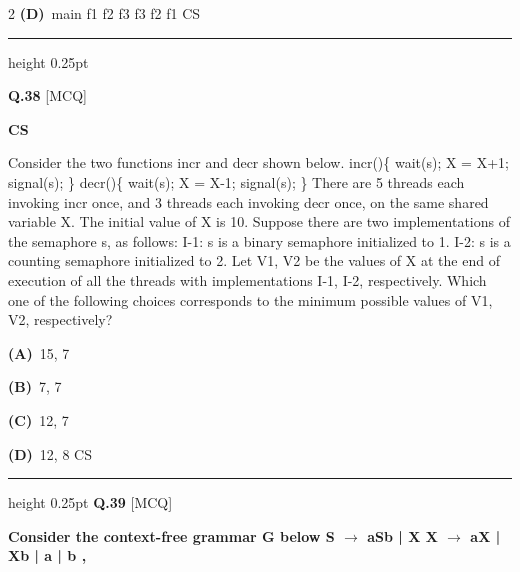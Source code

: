 \documentclass[a4paper,10pt,twoside]{article}
\begin{document}
\begin{multicols}{2}
$$\textbf{(D)}~main \newline f1 f2 f3 \newline f3 \newline f2 \newline f1 \newline CS
\par\vspace{6pt}\hrule height 0.25pt\vspace{6pt}

\vspace{6pt}
\vspace{3pt}

\noindent\textbf{Q.38} \hfill {\footnotesize\textsf{[MCQ]}}
\par\vspace{2pt}
{\bfseries CS
\par\smallskip
Consider the two functions incr and decr shown below.
incr()\{
wait(s);
X = X+1;
signal(s);
\}
decr()\{
wait(s);
X = X-1;
signal(s);
\}
There are 5 threads each invoking incr once, and 3 threads each invoking decr
once, on the same shared variable X. The initial value of X is 10.
Suppose there are two implementations of the semaphore s, as follows:
I-1: s is a binary semaphore initialized to 1.
I-2: s is a counting semaphore initialized to 2.
Let V1, V2 be the values of X at the end of execution of all the threads with
implementations I-1, I-2, respectively.
Which one of the following choices corresponds to the minimum possible values of
V1, V2, respectively? \par}
\par\vspace{2pt}\noindent
\textbf{(A)}~15, 7\par\vspace{2pt}\noindent
\textbf{(B)}~7, 7\par\vspace{2pt}\noindent
\textbf{(C)}~12, 7\par\vspace{2pt}\noindent
\textbf{(D)}~12, 8 \newline CS
\par\vspace{6pt}\hrule height 0.25pt\vspace{6pt}
\noindent\textbf{Q.39} \hfill {\footnotesize\textsf{[MCQ]}}
\par\vspace{2pt}
{\bfseries Consider the context-free grammar G below
S
$\to$
aSb | X
X
$\to$
aX | Xb | a | b ,
}
\end{multicols}
\end{document}
